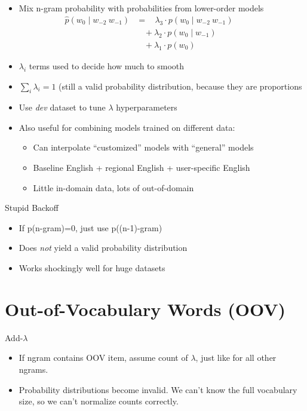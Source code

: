 \documentclass[11pt,letterpaper]{article}
\begin{document}
\begin{itemize}
  \item Mix n-gram probability with probabilities from lower-order models
    \begin{align*}
      \hat{p}(w_0 \mid w_{-2}~w_{-1}) &= ~~~~ \lambda_3 \cdot p(w_0 \mid w_{-2}~w_{-1}) &&&& \\
                                        &~~~~+ \lambda_2 \cdot p(w_0 \mid w_{-1}) \\
                                        &~~~~+ \lambda_1 \cdot p(w_0)
    \end{align*}
  \item $\lambda_i$ terms used to decide how much to smooth
  \item $\sum_i \lambda_i = 1$ (still a valid probability distribution, because they are proportions
  \item Use \textit{dev} dataset to tune $\lambda$ hyperparameters
  \item Also useful for combining models trained on different data:
  \begin{itemize}
    \item Can interpolate ``customized'' models with ``general'' models
    \item Baseline English + regional English + user-specific English
    \item Little in-domain data, lots of out-of-domain
  \end{itemize}
\end{itemize}


Stupid Backoff

\begin{itemize}
  \item If p(n-gram)=0, just use p((n-1)-gram)
  \item Does \textit{not} yield a valid probability distribution
  \item Works shockingly well for huge datasets
\end{itemize}


\section{Out-of-Vocabulary Words (OOV)}

Add-$\lambda$

\begin{itemize}
  \item If ngram contains OOV item, assume count of $\lambda$, just like for all other ngrams.
  \item Probability distributions become invalid.  We can't know the full vocabulary size, so we can't normalize counts correctly.
\end{itemize}
\end{document}
